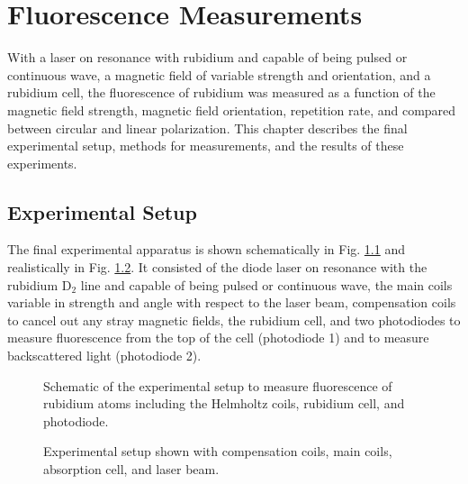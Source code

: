 \chapter{Fluorescence Measurements}
With a laser on resonance with rubidium and capable of being pulsed or continuous wave, a magnetic field of variable strength and orientation, and a rubidium cell, the fluorescence of rubidium was measured as a function of the magnetic field strength, magnetic field orientation, repetition rate, and compared between circular and linear polarization. This chapter describes the final experimental setup, methods for measurements, and the results of these experiments.

\section{Experimental Setup}
The final experimental apparatus is shown schematically in Fig. \ref{fig:expsetup} and realistically in Fig. \ref{fig:expsetupactual}. It consisted of the diode laser on resonance with the rubidium D$_2$ line and capable of being pulsed or continuous wave, the main coils variable in strength and angle with respect to the laser beam, compensation coils to cancel out any stray magnetic fields, the rubidium cell, and two photodiodes to measure fluorescence from the top of the cell (photodiode 1) and to measure backscattered light (photodiode 2). 

\begin{figure}[ht]
	\centering
	
	\caption{Schematic of the experimental setup to measure fluorescence of rubidium atoms including the Helmholtz coils, rubidium cell, and photodiode.}
	\label{fig:expsetup}
\end{figure}

\begin{figure}[htpb]
	\centering
	\caption{Experimental setup shown with compensation coils, main coils, absorption cell, and laser beam.}
	\label{fig:expsetupactual}
\end{figure}

